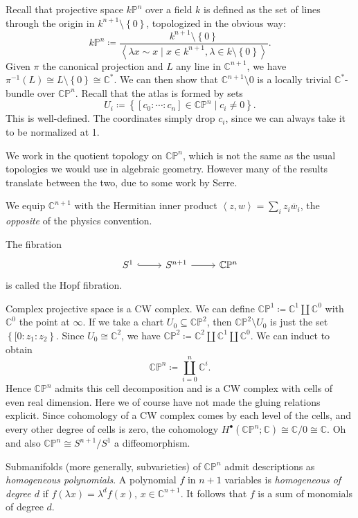 Recall that projective space $k\mathbb{P} ^n$ over a field $k$ is defined as the set of lines through the origin in $k ^{n+1} \setminus \left\{ 0 \right\} $, topologized in the obvious way:
\[
	k\mathbb{P} ^n \coloneqq \frac{k^{n+1}\setminus \left\{ 0 \right\} }{ \left\langle \lambda x \sim x \mid x\in k^{n+1} ,\lambda \in k\setminus \left\{ 0 \right\}  \right\rangle 
}.\]
Given $\pi $ the canonical projection and $L$ any line in $\mathbb{C} ^{n+1} $, we have $\pi ^{-1} (L)\cong L\setminus \left\{ 0 \right\} \cong \mathbb{C} ^*$. We can then show that $\mathbb{C} ^{n+1} \setminus 0$ is a locally trivial $\mathbb{C} ^*$-bundle over $\mathbb{C} \mathbb{P} ^n$. Recall that the atlas is formed by sets
\[
	U_i \coloneqq \left\{ [c_0 : \cdots : c_n]\in\mathbb{C} \mathbb{P} ^n \mid c_i \neq 0 \right\} 
.\]
This is well-defined. The coordinates simply drop $c_i$, since we can always take it to be normalized at 1.

\begin{remark}
	We work in the quotient topology on $\mathbb{C} \mathbb{P} ^n$, which is not the same as the usual topologies we would use in algebraic geometry. However many of the results translate between the two, due to some work by Serre.
\end{remark}

We equip $\mathbb{C} ^{n+1} $ with the Hermitian inner product $\left\langle z,w \right\rangle =\sum_{i} z_i \overline{w} _i$, the \emph{opposite} of the physics convention.

The fibration
\[\begin{tikzcd}[row sep = 2.5em, column sep = 2.5em]
S^1 \ar[hook, r]  & S^{n+1} \ar[r]  & \mathbb{C} \mathbb{P} ^n
\end{tikzcd}\]
is called the Hopf fibration.

Complex projective space is a CW complex. We can define $\mathbb{C} \mathbb{P} ^1 \coloneqq \mathbb{C} ^1 \amalg \mathbb{C} ^0$ with $\mathbb{C} ^0$ the point at $\infty $. If we take a chart $U_0 \subseteq \mathbb{C} \mathbb{P} ^2$, then $\mathbb{C} \mathbb{P} ^2\setminus U_0$ is just the set $\left\{ [0 : z_1 : z_2 \right\} $. Since $U_0 \cong \mathbb{C} ^2$, we have $\mathbb{C} \mathbb{P} ^2 \coloneqq \mathbb{C} ^2 \amalg \mathbb{C} ^1 \amalg \mathbb{C} ^0$. We can induct to obtain
\[
	\mathbb{C} \mathbb{P} ^n \coloneqq \coprod_{i=0}^{n} \mathbb{C} ^i
.\]
Hence $\mathbb{C} \mathbb{P} ^n$ admits this cell decomposition and is a CW complex with cells of even real dimension. Here we of course have not made the gluing relations explicit. Since cohomology of a CW complex comes by each level of the cells, and every other degree of cells is zero, the cohomology $H^{\bullet} (\mathbb{C} \mathbb{P} ^n;\mathbb{C} )\cong \mathbb{C} / 0 \cong  \mathbb{C} $. Oh and also $\mathbb{C} \mathbb{P} ^n \cong S^{n+1} /S^1$ a diffeomorphism.

Submanifolds (more generally, subvarieties) of $\mathbb{C} \mathbb{P} ^n$ admit descriptions as \emph{homogeneous polynomials}. A polynomial $f$ in $n+1$ variables is \emph{homogeneous of degree $d$} if $f(\lambda x)=\lambda ^df(x)$, $x\in\mathbb{C} ^{n+1} $. It follows that $f$ is a sum of monomials of degree $d$.

